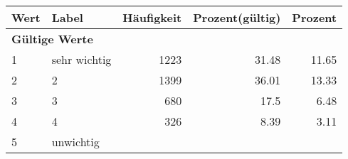      \begin{longtable}{lXrrr}
     \toprule
     \textbf{Wert} & \textbf{Label} & \textbf{Häufigkeit} & \textbf{Prozent(gültig)} & \textbf{Prozent} \\
     \endhead
     \midrule
     \multicolumn{5}{l}{\textbf{Gültige Werte}}\\

     1 &
     \multicolumn{1}{X}{ sehr wichtig   } &


       \num{1223} &
       \num[round-mode=places,round-precision=2]{31.48} &
         \num[round-mode=places,round-precision=2]{11.65} \\

     2 &
     \multicolumn{1}{X}{ 2   } &


       \num{1399} &
       \num[round-mode=places,round-precision=2]{36.01} &
         \num[round-mode=places,round-precision=2]{13.33} \\

     3 &
     \multicolumn{1}{X}{ 3   } &


       \num{680} &
       \num[round-mode=places,round-precision=2]{17.5} &
         \num[round-mode=places,round-precision=2]{6.48} \\

     4 &
     \multicolumn{1}{X}{ 4   } &


       \num{326} &
       \num[round-mode=places,round-precision=2]{8.39} &
         \num[round-mode=places,round-precision=2]{3.11} \\

     5 &
     \multicolumn{1}{X}{ unwichtig   } &



\end{longtable}
